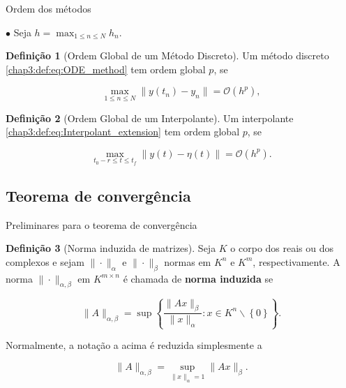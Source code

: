 \documentclass{beamer}
\theoremstyle{plain}
\theoremstyle{definition}
\newtheorem{defi}{Definição}
\begin{document}
\begin{frame}{Ordem dos métodos}

    \small

    \phantom{aa} $\bullet$ Seja $h = \max_{1 \leq n \leq N} h_n$.


    \begin{defi}[Ordem Global de um Método Discreto]
        
        Um método discreto \eqref{chap3:def:eq:ODE_method} tem ordem global $p$, se 

        \begin{equation}
            \max_{1 \leq n \leq N} \| y(t_n) - y_n \| = \mathcal{O}(h^p),
        \end{equation}
    \end{defi}


    \begin{defi}[Ordem Global de um Interpolante]
        
        Um interpolante \eqref{chap3:def:eq:Interpolant_extension} tem ordem global $p$, se 

        \begin{equation}
            \max_{t_0 - r \leq t \leq t_f} \| y(t) - \eta(t) \| = \mathcal{O}(h^{p}).
        \end{equation}
    \end{defi}

\end{frame}

\subsection{Teorema de convergência}

\begin{frame}{Preliminares para o teorema de convergência}
    \begin{defi}[Norma induzida de matrizes]
        \label{apendices:def:induced_matrix_norm}
        Seja $K$ o corpo dos reais ou dos complexos e sejam $\|\cdot\|_\alpha$ e $\|\cdot\|_\beta$ normas em $K^n$ e $K^m$, respectivamente.
        A norma $\| \cdot \|_{\alpha, \beta}$ em $K^{m \times n}$ é chamada de \textbf{norma induzida} se 

        \[ \| A \|_{\alpha, \beta} = \sup\left\{\frac{\|Ax\|_\beta}{\|x\|_\alpha} : x\in K^n \backslash \left\{0\right\} \right\}. \]


        Normalmente, a notação a acima é reduzida simplesmente a 

        \[ \| A \|_{\alpha, \beta} = \sup_{\|x\|_\alpha = 1} \|Ax\|_\beta.\]

    \end{defi}


\end{frame}
\end{document}
